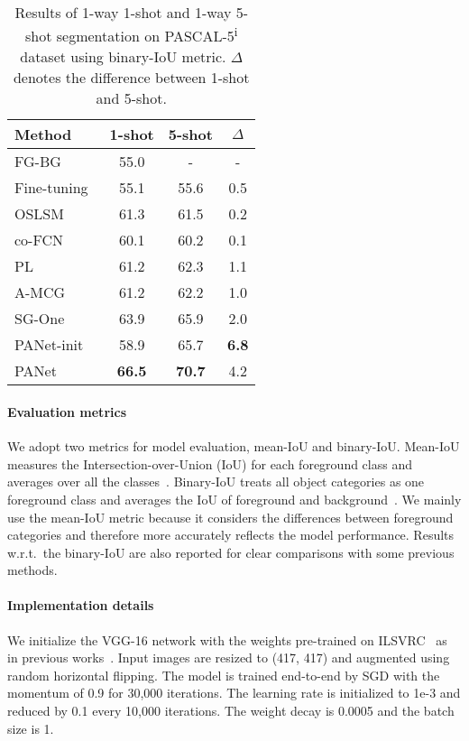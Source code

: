 \documentclass[10pt,twocolumn,letterpaper]{article}
\begin{document}
\begin{table}[t!]
\centering
 \begin{tabular}{l|c c c} 
\toprule
 Method & 1-shot & 5-shot & $\Delta$
 \\
 \midrule
 FG-BG~\cite{rakelly2018conditional}
        & 55.0 & - & -
 \\
 Fine-tuning~\cite{rakelly2018conditional}
        & 55.1 & 55.6 & 0.5
 \\
 OSLSM~\cite{shaban2017one}
        & 61.3 & 61.5 & 0.2
 \\
 co-FCN~\cite{rakelly2018conditional}
        & 60.1 & 60.2 & 0.1
 \\
 PL~\cite{dong2018few}
        & 61.2 & 62.3 & 1.1
 \\
 A-MCG~\cite{Hu2018AttentionbasedMG}
        & 61.2 & 62.2 & 1.0
 \\
 SG-One~\cite{zhang2018sg}
        & 63.9 & 65.9 & 2.0
 \\
 PANet-init
        & 58.9 & 65.7 & \textbf{6.8}
 \\
 PANet
        & \textbf{66.5} & \textbf{70.7} & 4.2
 \\
\bottomrule
 \end{tabular}
 \caption{Results of 1-way 1-shot and 1-way 5-shot segmentation on PASCAL-5\textsuperscript{i} dataset using binary-IoU metric. $\Delta$ denotes the difference between 1-shot and 5-shot.}
\label{table:pascal_result_binaryIoU}
\end{table}

\vspace{-12pt}
\paragraph{Evaluation metrics} We adopt two metrics for model evaluation, mean-IoU and binary-IoU. Mean-IoU measures the Intersection-over-Union (IoU) for each foreground class and averages over all the classes~\cite{shaban2017one, zhang2018sg}. Binary-IoU treats all object categories as one foreground class and averages the IoU of foreground and background~\cite{rakelly2018conditional, dong2018few, Hu2018AttentionbasedMG}. We mainly use the mean-IoU metric because it considers the differences between foreground categories and therefore more accurately reflects  the model performance. Results w.r.t.\ the binary-IoU are also reported for clear comparisons with some previous methods.

\vspace{-12pt}
\paragraph{Implementation details} We initialize the VGG-16 network with the weights pre-trained on ILSVRC~\cite{ILSVRC15} as in previous works~\cite{shaban2017one, dong2018few, zhang2018sg}. Input images are resized to (417, 417) and augmented using random horizontal flipping. The model is trained end-to-end by SGD with the momentum of 0.9 for 30,000 iterations. The learning rate is initialized to 1e-3 and reduced by 0.1 every 10,000 iterations. The weight decay is 0.0005 and the batch size is 1.
\end{document}
